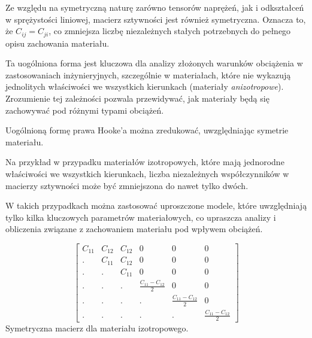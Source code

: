 Ze względu na symetryczną naturę zarówno tensorów naprężeń, jak i odkształceń w sprężystości liniowej, macierz sztywności jest również symetryczna. Oznacza to, że $C_{ij}=C_{ji}$, co zmniejsza liczbę niezależnych stałych potrzebnych do pełnego opisu zachowania materiału.

Ta uogólniona forma jest kluczowa dla analizy złożonych warunków obciążenia w zastosowaniach inżynieryjnych, szczególnie w materiałach, które nie wykazują jednolitych właściwości we wszystkich kierunkach (materiały \textit{anizotropowe}). Zrozumienie tej zależności pozwala przewidywać, jak materiały będą się zachowywać pod różnymi typami obciążeń.

Uogólnioną formę prawa Hooke'a można zredukować, uwzględniając symetrie materiału. 

Na przykład w przypadku materiałów izotropowych, które mają jednorodne właściwości we wszystkich kierunkach, liczba niezależnych współczynników w macierzy sztywności może być zmniejszona do nawet tylko dwóch. 

W takich przypadkach można zastosować uproszczone modele, które uwzględniają tylko kilka kluczowych parametrów materiałowych, co upraszcza analizy i obliczenia związane z zachowaniem materiału pod wpływem obciążeń.

$$
\begin{bmatrix}
C_{11} & C_{12} & C_{12} & 0 & 0 & 0 \\
. & C_{11} & C_{12} & 0 & 0 & 0 \\
. & . & C_{11} & 0 & 0 & 0 \\
. & . & . & \frac{C_{11} - C_{12}}{2} & 0 & 0 \\
. & . & . & . & \frac{C_{11} - C_{12}}{2} & 0 \\
. & . & . & . & . & \frac{C_{11} - C_{12}}{2}
\end{bmatrix}
$$
Symetryczna macierz dla materiału izotropowego.

